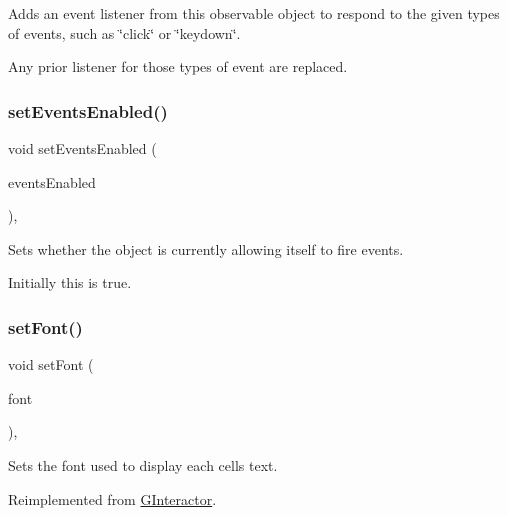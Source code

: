 Adds an event listener from this observable object to respond to the given types of events, such as \char`\"{}click\char`\"{} or \char`\"{}keydown\char`\"{}. 

Any prior listener for those types of event are replaced. \mbox{\label{classsgl_1_1GObservable_afaa30b2a9e0f378fd1c70d2f1d0b8216}} 
\subsubsection{\texorpdfstring{set\+Events\+Enabled()}{setEventsEnabled()}}
{\footnotesize\ttfamily void set\+Events\+Enabled (\begin{DoxyParamCaption}\item[{bool}]{events\+Enabled }\end{DoxyParamCaption})\hspace{0.3cm}{\ttfamily [virtual]}, {\ttfamily [inherited]}}



Sets whether the object is currently allowing itself to fire events. 

Initially this is true. \mbox{\label{classsgl_1_1GTable_ad1d75b3840a41ba7d1e8a921696dc684}} 
\subsubsection{\texorpdfstring{set\+Font()}{setFont()}\hspace{0.1cm}{\footnotesize\ttfamily [1/2]}}
{\footnotesize\ttfamily void set\+Font (\begin{DoxyParamCaption}\item[{const Q\+Font \&}]{font }\end{DoxyParamCaption})\hspace{0.3cm}{\ttfamily [override]}, {\ttfamily [virtual]}}



Sets the font used to display each cell\textquotesingle{}s text. 



Reimplemented from \mbox{\hyperlink{classsgl_1_1GInteractor_a2592348886ffea646c6534bf88f7c49d}{G\+Interactor}}.

